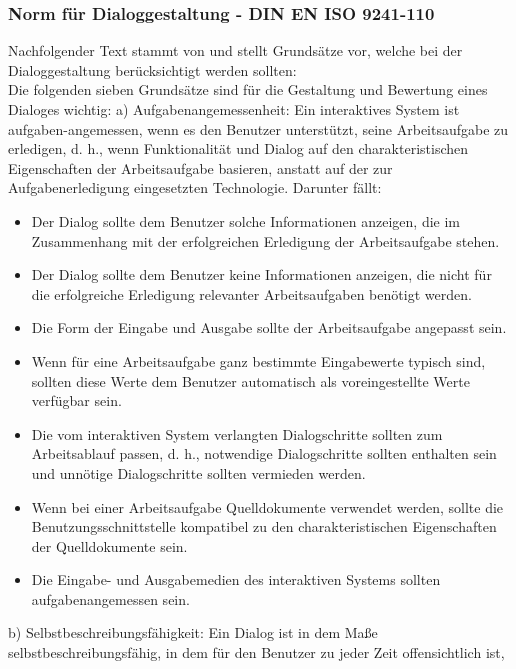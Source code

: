 \subsubsection{Norm für Dialoggestaltung - DIN EN ISO 9241-110}
Nachfolgender Text stammt von \cite{DIN2} und stellt Grundsätze vor, welche bei der Dialoggestaltung berücksichtigt werden sollten: \newline
\\
Die folgenden sieben Grundsätze sind für die Gestaltung und Bewertung eines Dialoges wichtig:\newline
\newline
a) Aufgabenangemessenheit:\newline
Ein interaktives System ist aufgaben-angemessen, wenn es den Benutzer unterstützt, seine Arbeitsaufgabe zu
erledigen, d. h., wenn Funktionalität und Dialog auf den charakteristischen Eigenschaften der Arbeitsaufgabe
basieren, anstatt auf der zur Aufgabenerledigung eingesetzten Technologie. Darunter fällt:
\begin{itemize}
	\item Der Dialog sollte dem Benutzer solche Informationen anzeigen, die im Zusammenhang mit der
	erfolgreichen Erledigung der Arbeitsaufgabe stehen.
	\item Der Dialog sollte dem Benutzer keine Informationen anzeigen, die nicht für die erfolgreiche Erledigung relevanter Arbeitsaufgaben benötigt werden.
	\item Die Form der Eingabe und Ausgabe sollte der Arbeitsaufgabe angepasst sein.
	\item Wenn für eine Arbeitsaufgabe ganz bestimmte Eingabewerte typisch sind, sollten diese Werte dem
	Benutzer automatisch als voreingestellte Werte verfügbar sein.
	\item Die vom interaktiven System verlangten Dialogschritte sollten zum Arbeitsablauf passen, d. h.,
	notwendige Dialogschritte sollten enthalten sein und unnötige Dialogschritte sollten vermieden werden.
	\item Wenn bei einer Arbeitsaufgabe Quelldokumente verwendet werden, sollte die Benutzungsschnittstelle
	kompatibel zu den charakteristischen Eigenschaften der Quelldokumente sein.
	\item Die Eingabe- und Ausgabemedien des interaktiven Systems sollten aufgabenangemessen sein.
\end{itemize}
b) Selbstbeschreibungsfähigkeit:\newline
Ein Dialog ist in dem Maße selbstbeschreibungsfähig, in dem für den Benutzer zu jeder Zeit offensichtlich ist,
